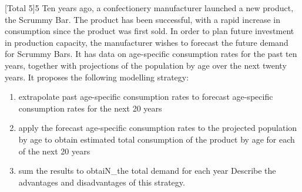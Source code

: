 \documentclass[a4paper,12pt]{article}
\begin{document}
 
[Total 5]5
Ten years ago, a confectionery manufacturer launched a new product, the Scrummy
Bar. The product has been successful, with a rapid increase in consumption since the product was first sold. In order to plan future investment in production capacity, the
manufacturer wishes to forecast the future demand for Scrummy Bars. It has data on age-specific consumption rates for the past ten years, together with projections of the
population by age over the next twenty years. It proposes the following modelling strategy:
\begin{enumerate}
\item extrapolate past age-specific consumption rates to forecast age-specific consumption rates for the next 20 years
\item apply the forecast age-specific consumption rates to the projected population by
age to obtain estimated total consumption of the product by age for each of the
next 20 years
\item sum the results to obtaiN_the total demand for each year
Describe the advantages and disadvantages of this strategy.
\end{enumerate}

\newpage
\end{document}
